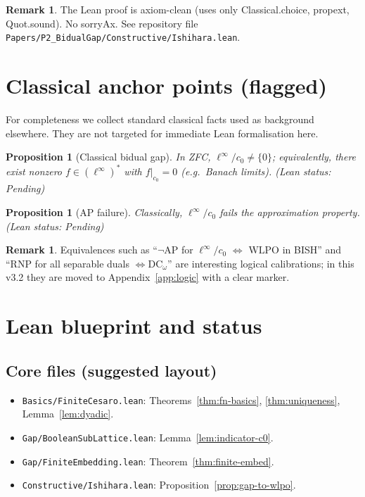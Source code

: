\documentclass[11pt]{article}
\newtheorem{proposition}[theorem]{Proposition}
\theoremstyle{definition}
\newtheorem{remark}[theorem]{Remark}
\newcommand{\linf}{\ell^\infty}
\newcommand{\cnull}{c_0}
\newcommand{\WLPO}{\mathrm{WLPO}}
\newcommand{\DCw}{\mathrm{DC}_\omega}
\newcommand{\leanpending}{\textsf{\small (Lean status: Pending)}}
\begin{document}
\begin{remark}
The Lean proof is axiom-clean (uses only \textsf{Classical.choice}, \textsf{propext},
\textsf{Quot.sound}). No \textsf{sorryAx}. See repository file
\texttt{Papers/P2\_BidualGap/Constructive/Ishihara.lean}.
\end{remark}

\section{Classical anchor points (flagged)}
\label{sec:classical}

For completeness we collect standard classical facts used as background elsewhere.
They are not targeted for immediate Lean formalisation here.

\begin{proposition}[Classical bidual gap]\label{prop:classical-gap}
In ZFC, $\linf/\cnull\ne\{0\}$; equivalently, there exist nonzero $f\in(\linf)^*$ with
$f|_{\cnull}=0$ (e.g.\ Banach limits). \leanpending
\end{proposition}

\begin{proposition}[AP failure]\label{prop:ap-fails}
Classically, $\linf/\cnull$ fails the approximation property. \leanpending
\end{proposition}

\begin{remark}
Equivalences such as ``$\neg\mathrm{AP}$ for $\linf/\cnull$ $\Longleftrightarrow$ $\WLPO$ in BISH''
and ``RNP for all separable duals $\Longleftrightarrow \DCw$'' are interesting logical
calibrations; in this v3.2 they are moved to Appendix~\ref{app:logic} with a clear marker.
\end{remark}

\appendix

\section{Lean blueprint and status}\label{app:lean}

\subsection*{Core files (suggested layout)}
\begin{itemize}[leftmargin=1.65em]
  \item \texttt{Basics/FiniteCesaro.lean}: Theorems~\ref{thm:fn-basics}, \ref{thm:uniqueness},
        Lemma~\ref{lem:dyadic}.
  \item \texttt{Gap/BooleanSubLattice.lean}: Lemma~\ref{lem:indicator-c0}.
  \item \texttt{Gap/FiniteEmbedding.lean}: Theorem~\ref{thm:finite-embed}.
  \item \texttt{Constructive/Ishihara.lean}: Proposition~\ref{prop:gap-to-wlpo}.
\end{itemize}
\end{document}
